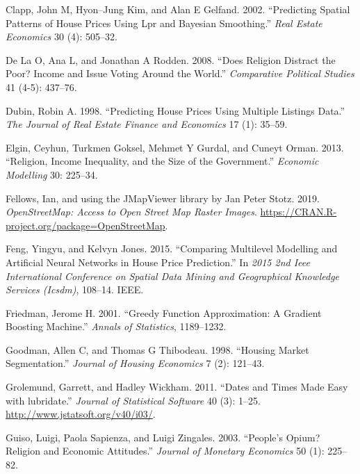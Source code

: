 \documentclass[conference,final,]{IEEEtran}
\newlength{\cslhangindent}
\newenvironment{cslreferences}%
  {\setlength{\parindent}{0pt}%
  \everypar{\setlength{\hangindent}{\cslhangindent}}\ignorespaces}%
  {\par}
\begin{document}
\begin{cslreferences}
\leavevmode\hypertarget{ref-clapp2002predicting}{}%
Clapp, John M, Hyon--Jung Kim, and Alan E Gelfand. 2002. ``Predicting Spatial Patterns of House Prices Using Lpr and Bayesian Smoothing.'' \emph{Real Estate Economics} 30 (4): 505--32.

\leavevmode\hypertarget{ref-de2008does}{}%
De La O, Ana L, and Jonathan A Rodden. 2008. ``Does Religion Distract the Poor? Income and Issue Voting Around the World.'' \emph{Comparative Political Studies} 41 (4-5): 437--76.

\leavevmode\hypertarget{ref-dubin1998predicting}{}%
Dubin, Robin A. 1998. ``Predicting House Prices Using Multiple Listings Data.'' \emph{The Journal of Real Estate Finance and Economics} 17 (1): 35--59.

\leavevmode\hypertarget{ref-elgin2013religion}{}%
Elgin, Ceyhun, Turkmen Goksel, Mehmet Y Gurdal, and Cuneyt Orman. 2013. ``Religion, Income Inequality, and the Size of the Government.'' \emph{Economic Modelling} 30: 225--34.

\leavevmode\hypertarget{ref-R-OpenStreetMap}{}%
Fellows, Ian, and using the JMapViewer library by Jan Peter Stotz. 2019. \emph{OpenStreetMap: Access to Open Street Map Raster Images}. \url{https://CRAN.R-project.org/package=OpenStreetMap}.

\leavevmode\hypertarget{ref-feng2015comparing}{}%
Feng, Yingyu, and Kelvyn Jones. 2015. ``Comparing Multilevel Modelling and Artificial Neural Networks in House Price Prediction.'' In \emph{2015 2nd Ieee International Conference on Spatial Data Mining and Geographical Knowledge Services (Icsdm)}, 108--14. IEEE.

\leavevmode\hypertarget{ref-friedman2001greedy}{}%
Friedman, Jerome H. 2001. ``Greedy Function Approximation: A Gradient Boosting Machine.'' \emph{Annals of Statistics}, 1189--1232.

\leavevmode\hypertarget{ref-goodman1998housing}{}%
Goodman, Allen C, and Thomas G Thibodeau. 1998. ``Housing Market Segmentation.'' \emph{Journal of Housing Economics} 7 (2): 121--43.

\leavevmode\hypertarget{ref-R-lubridate}{}%
Grolemund, Garrett, and Hadley Wickham. 2011. ``Dates and Times Made Easy with lubridate.'' \emph{Journal of Statistical Software} 40 (3): 1--25. \url{http://www.jstatsoft.org/v40/i03/}.

\leavevmode\hypertarget{ref-guiso2003people}{}%
Guiso, Luigi, Paola Sapienza, and Luigi Zingales. 2003. ``People's Opium? Religion and Economic Attitudes.'' \emph{Journal of Monetary Economics} 50 (1): 225--82.


\end{cslreferences}
\end{document}
